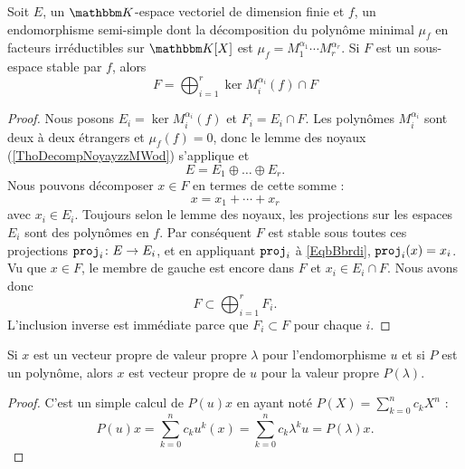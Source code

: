 \begin{corollary}   \label{CorKiSCkC}
    Soit \( E\), un \( \eK\)-espace vectoriel de dimension finie et \( f\), un endomorphisme semi-simple dont la décomposition du polynôme minimal \( \mu_f\) en facteurs irréductibles sur \( \eK[X]\) est \( \mu_f=M_1^{\alpha_1}\cdots M_r^{\alpha_r}\). Si \( F\) est un sous-espace stable par \( f\), alors
    \begin{equation}
        F=\bigoplus_{i=1}^r\ker M_i^{\alpha_i}(f)\cap F
    \end{equation}
\end{corollary}

\begin{proof}
    Nous posons \( E_i=\ker M_i^{\alpha_i}(f)\) et \( F_i=E_i\cap F\). Les polynômes \( M_i^{\alpha_i}\) sont deux à deux étrangers et \( \mu_f(f)=0\), donc le lemme des noyaux (\ref{ThoDecompNoyayzzMWod}) s'applique et
    \begin{equation}
        E=E_1\oplus\ldots\oplus E_r.
    \end{equation}
    Nous pouvons décomposer \( x\in F\) en termes de cette somme :
    \begin{equation}     \label{EqbBbrdi}
        x=x_1+\cdots +x_r
    \end{equation}
    avec \( x_i\in E_i\). Toujours selon le lemme des noyaux, les projections sur les espaces \( E_i\) sont des polynômes en \( f\). Par conséquent \( F\) est stable sous toutes ces projections \( \operatorname{\texttt{proj}}_i\colon E\to E_i\), et en appliquant \( \operatorname{\texttt{proj}}_i\) à \eqref{EqbBbrdi}, \( \operatorname{\texttt{proj}}_i(x)=x_i\). Vu que \( x\in F\), le membre de gauche est encore dans \( F\) et \( x_i\in E_i\cap F\). Nous avons donc
    \begin{equation}
        F\subset\bigoplus_{i=1}^rF_i.
    \end{equation}
    L'inclusion inverse est immédiate parce que \( F_i\subset F\) pour chaque \( i\).
\end{proof}

\begin{lemma}   \label{LemVISooHxMdbr}
    Si \( x\) est un vecteur propre de valeur propre \( \lambda\) pour l'endomorphisme \( u\) et si \( P\) est un polynôme, alors \( x\) est vecteur propre de \( u\) pour la valeur propre \( P(\lambda)\).
\end{lemma}

\begin{proof}
    C'est un simple calcul de \( P(u)x\) en ayant noté \( P(X)=\sum_{k=0}^nc_kX^n\) :
    \begin{equation}
        P(u)x=\sum_{k=0}^nc_ku^k(x)=\sum_{k=0}^nc_k\lambda^ku=P(\lambda)x.
    \end{equation}
\end{proof}

